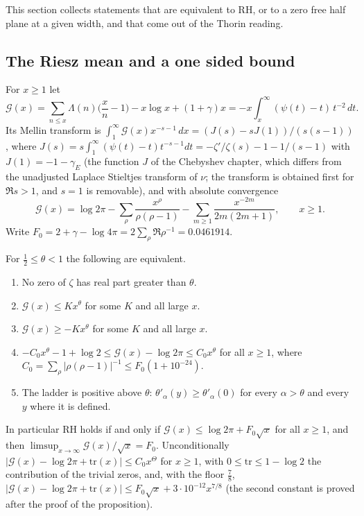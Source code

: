 This section collects statements that are equivalent to RH, or to a zero free half plane at a given width, and that come out of the Thorin reading.

\subsection{The Riesz mean and a one sided bound}

For $x\ge1$ let
\[
\mathcal G(x)=\sum_{n\le x}\Lambda(n)\Big(\frac xn-1\Big)-x\log x+(1+\gamma)x=-x\int_x^\infty(\psi(t)-t)\,t^{-2}\,dt .
\]
Its Mellin transform is $\int_1^\infty\mathcal G(x)x^{-s-1}\,dx=(J(s)-sJ(1))/(s(s-1))$, where $J(s)=s\int_1^\infty(\psi(t)-t)t^{-s-1}dt=-\zeta'/\zeta(s)-1-1/(s-1)$ with $J(1)=-1-\gamma_E$ (the function $J$ of the Chebyshev chapter, which differs from the unadjusted Laplace Stieltjes transform of $\nu$; the transform is obtained first for $\Re s>1$, and $s=1$ is removable), and with absolute convergence
\begin{equation}\label{qt:eq:riesz}
\mathcal G(x)=\log2\pi-\sum_\rho\frac{x^\rho}{\rho(\rho-1)}-\sum_{m\ge1}\frac{x^{-2m}}{2m(2m+1)},\qquad x\ge1 .
\end{equation}
Write $F_0=2+\gamma-\log4\pi=2\sum_\rho\Re\rho^{-1}=0.0461914$.

\begin{proposition}\label{qt:prop:riesz}
For $\tfrac12\le\theta<1$ the following are equivalent.
\begin{enumerate}
\item No zero of $\zeta$ has real part greater than $\theta$.
\item $\mathcal G(x)\le Kx^\theta$ for some $K$ and all large $x$.
\item $\mathcal G(x)\ge-Kx^\theta$ for some $K$ and all large $x$.
\item $-C_0x^\theta-1+\log2\le\mathcal G(x)-\log2\pi\le C_0x^\theta$ for all $x\ge1$, where $C_0=\sum_\rho|\rho(\rho-1)|^{-1}\le F_0(1+10^{-24})$.
\item The ladder is positive above $\theta$: $\theta'_\alpha(y)\ge\theta'_\alpha(0)$ for every $\alpha>\theta$ and every $y$ where it is defined.
\end{enumerate}
In particular RH holds if and only if $\mathcal G(x)\le\log2\pi+F_0\sqrt x$ for all $x\ge1$, and then $\limsup_{x\to\infty}\mathcal G(x)/\sqrt x=F_0$. Unconditionally $|\mathcal G(x)-\log2\pi+\mathrm{tr}(x)|\le C_0x^\Theta$ for $x\ge1$, with $0\le\mathrm{tr}\le1-\log2$ the contribution of the trivial zeros, and, with the floor $\tfrac78$, $|\mathcal G(x)-\log2\pi+\mathrm{tr}(x)|\le F_0\sqrt x+3\cdot10^{-12}x^{7/8}$ (the second constant is proved after the proof of the proposition).
\end{proposition}


